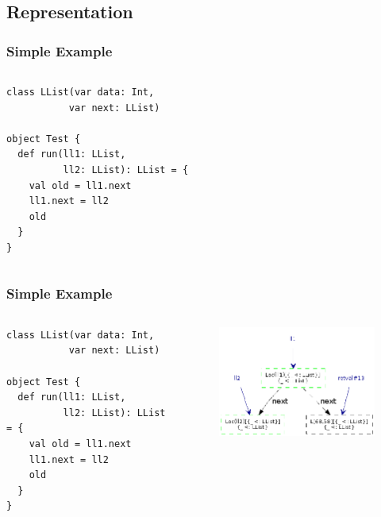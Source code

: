\documentclass[hyperref={pdfpagelabels=false}]{beamer}
\begin{document}
\subsection{Representation}

\begin{frame}[fragile]
\frametitle{Simple Example}
  \begin{columns}
    \begin{column}{0.4\textwidth}
\begin{lstlisting}
class LList(var data: Int,
           var next: LList)

object Test {
  def run(ll1: LList,
          ll2: LList): LList = {
    val old = ll1.next
    ll1.next = ll2
    old
  }
}
\end{lstlisting}
    \end{column}
    \begin{column}{0.6\textwidth}
      \begin{figure}[t]
      \end{figure}
    \end{column}
  \end{columns}
\end{frame}

\begin{frame}[fragile]
\frametitle{Simple Example}
  \begin{columns}
    \begin{column}{0.4\textwidth}
\begin{lstlisting}
class LList(var data: Int,
           var next: LList)

object Test {
  def run(ll1: LList,
          ll2: LList): LList = {
    val old = ll1.next
    ll1.next = ll2
    old
  }
}
\end{lstlisting}
    \end{column}
    \begin{column}{0.6\textwidth}
      \begin{figure}[t]
        \includegraphics[width=60mm]{images/e1.png}\\
      \end{figure}
    \end{column}
  \end{columns}
\end{frame}
\end{document}
